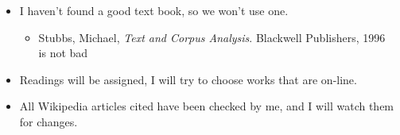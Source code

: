 \documentclass[a4paper,landscape,headrule,footrule]{foils}
\begin{document}




\begin{itemize}
\item I haven't found a good text book, so we won't use one.
  \begin{itemize}
  \item Stubbs, Michael, \textit{Text and Corpus Analysis}. Blackwell Publishers, 1996
\\ is not bad
  \end{itemize}
\item Readings will be assigned, I will try to choose
  works that are on-line.
\item All Wikipedia articles cited have been checked by me, and I will watch
  them for changes. 
\end{itemize}








\end{document}
